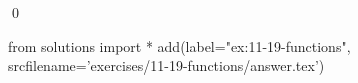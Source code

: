 
\begin{ex}
  \label{ex:11-19-functions}
  
  \qed
\end{ex}
\begin{python0}
from solutions import *
add(label="ex:11-19-functions",
    srcfilename='exercises/11-19-functions/answer.tex')
\end{python0}
